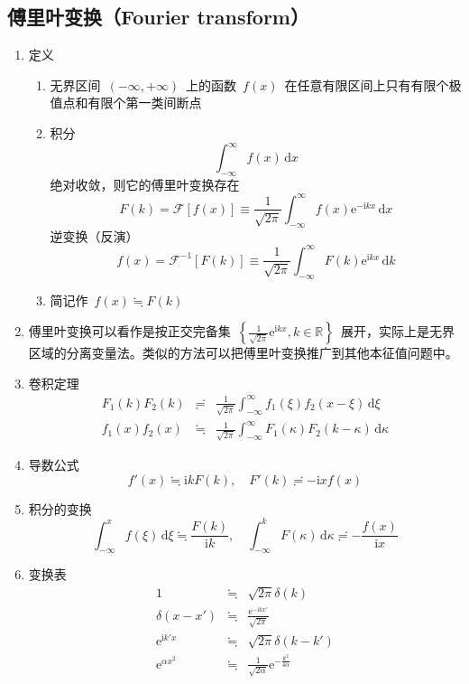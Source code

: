 \documentclass[12pt,a4paper]{article}
\newcommand\diff{\,\mathrm{d}}
\renewcommand{\[}{\ $\displaystyle}
\renewcommand{\]}{$\ }%
\newcommand\mi{\mathrm{i}}
\newcommand\e{\mathrm{e}}
\begin{document}
	\subsection{傅里叶变换（Fourier transform）}
	  \begin{enumerate}
	  	\item 定义
	  		\begin{enumerate}
	  		 \item 无界区间\[(-\infty,+\infty)\]上的函数\[f(x)\]在任意有限区间上只有有限个极值点和有限个第一类间断点
	  		 \item 积分
	  		 $$
	  		   \int_{-\infty}^{\infty}f(x)\diff x
	  		 $$
	  		 绝对收敛，则它的傅里叶变换存在
	  		 $$
	  		   F(k) = \mathscr{F}[f(x)] \equiv \frac 1{\sqrt{2\pi}}\int_{-\infty}^\infty f(x)\e^{-\mi kx}\diff x
	  		 $$
	  		 逆变换（反演）
	  		 $$
	  		   f(x) = \mathscr{F}^{-1}[F(k)]\equiv \frac 1{\sqrt{2\pi}}\int_{-\infty}^{\infty}F(k)\e^{\mi kx}\diff k
	  		 $$
	  		 \item 简记作\[f(x)\fallingdotseq F(k)\]
	  		\end{enumerate}
	  	\item 傅里叶变换可以看作是按正交完备集\[\left\{\frac{1}{\sqrt{2\pi}}\e^{\mi kx},k\in \mathbb R\right\}\]展开，实际上是无界区域的分离变量法。类似的方法可以把傅里叶变换推广到其他本征值问题中。
	  	\item 卷积定理
	  		\begin{eqnarray*}
	  		  F_1(k)F_2(k) &\risingdotseq & \frac 1{\sqrt{2\pi}}\int_{-\infty}^{\infty}f_1(\xi)f_2(x-\xi)\diff\xi \\
	  		  f_1(x)f_2(x) &\fallingdotseq & \frac 1{\sqrt{2\pi}}\int_{-\infty}^{\infty}F_1(\kappa)F_2(k-\kappa)\diff\kappa
	  		\end{eqnarray*}
	  	\item 导数公式
	  	$$f'(x)\fallingdotseq \mi kF(k),\quad F'(k)\risingdotseq -\mi xf(x)$$
	  	\item 积分的变换
	  	$$\int_{-\infty}^x f(\xi)\diff\xi\fallingdotseq \frac{F(k)}{\mi k},\quad \int_{-\infty}^k F(\kappa)\diff \kappa \risingdotseq -\frac{f(x)}{\mi x}$$
	  	\item  变换表
	  		\begin{eqnarray*}
	  		  1 &\fallingdotseq & \sqrt{2\pi}\delta(k) \\
	  		  \delta(x-x') &\fallingdotseq & \frac{\e^{-\mi kx'}}{\sqrt{2\pi}} \\
	  		  \e^{\mi k'x}&\fallingdotseq & \sqrt{2\pi}\delta(k-k') \\
	  		  \e^{\alpha x^2} &\fallingdotseq & \frac{1}{\sqrt{2\alpha}}\e^{-\frac{k^2}{4\alpha}}\\

\end{eqnarray*}
\end{enumerate}
\end{document}
